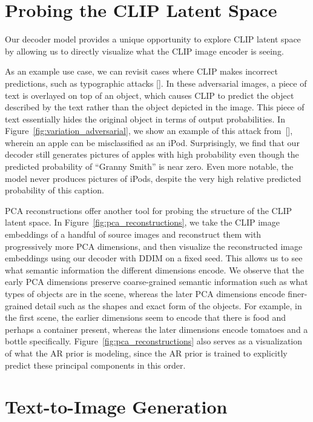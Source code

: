 \section{Probing the CLIP Latent Space}
\label{sec:latentspace}

Our decoder model provides a unique opportunity to explore CLIP latent space by allowing us to directly visualize what the CLIP image encoder is seeing. 

As an example use case, we can revisit cases where CLIP makes incorrect predictions, such as typographic attacks []. In these adversarial images, a piece of text is overlayed on top of an object, which causes CLIP to predict the object described by the text rather than the object depicted in the image. This piece of text essentially hides the original object in terms of output probabilities. In Figure~\ref{fig:variation_adversarial}, we show an example of this attack from~[], wherein an apple can be misclassified as an iPod. Surprisingly, we find that our decoder still generates pictures of apples with high probability even though the predicted probability of ``Granny Smith'' is near zero. Even more notable, the model never produces pictures of iPods, despite the very high relative predicted probability of this caption.

PCA reconstructions offer another tool for probing the structure of the CLIP latent space. In Figure~\ref{fig:pca_reconstructions}, we take the CLIP image embeddings of a handful of source images and reconstruct them with progressively more PCA dimensions, and then visualize the reconstructed image embeddings using our decoder with DDIM on a fixed seed. This allows us to see what semantic information the different dimensions encode. We observe that the early PCA dimensions preserve coarse-grained semantic information such as what types of objects are in the scene, whereas the later PCA dimensions encode finer-grained detail such as the shapes and exact form of the objects. For example, in the first scene, the earlier dimensions seem to encode that there is food and perhaps a container present, whereas the later dimensions encode tomatoes and a bottle specifically. Figure~\ref{fig:pca_reconstructions} also serves as a visualization of what the AR prior is modeling, since the AR prior is trained to explicitly predict these principal components in this order.

\section{Text-to-Image Generation}

